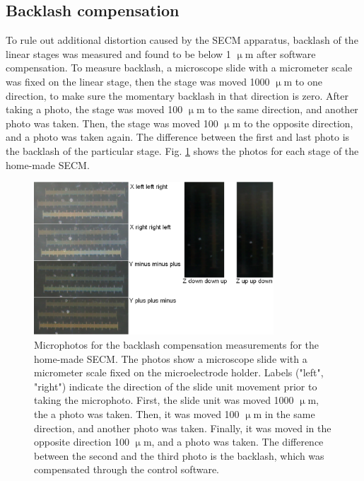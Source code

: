 		\subsection{Backlash compensation}
To rule out additional distortion caused by the SECM apparatus, backlash of the linear stages was measured and found to be below 1 $\upmu$m after software compensation.
To measure backlash, a microscope slide with a micrometer scale was fixed on the linear stage, then the stage was moved 1000 $\upmu$m to one direction, to make sure the momentary backlash in that direction is zero.
After taking a photo, the stage was moved 100 $\upmu$m to the same direction, and another photo was taken.
Then, the stage was moved 100 $\upmu$m to the opposite direction, and a photo was taken again.
The difference between the first and last photo is the backlash of the particular stage.
Fig. \ref{fig:backlash} shows the photos for each stage of the home-made SECM.

\begin{figure}
\centering
\includegraphics[width=0.8\textwidth]{img/backlash.eps}
\caption[Microphotos for the backlash compensation measurements for the home-made SECM.]{Microphotos for the backlash compensation measurements for the home-made SECM.
The photos show a microscope slide with a micrometer scale fixed on the microelectrode holder.
Labels ("left", "right") indicate the direction of the slide unit movement prior to taking the microphoto.
First, the slide unit was moved 1000 $\upmu$m, the a photo was taken.
Then, it was moved 100 $\upmu$m in the same direction, and another photo was taken.
Finally, it was moved in the opposite direction 100 $\upmu$m, and a photo was taken.
The difference between the second and the third photo is the backlash, which was compensated through the control software.}
\label{fig:backlash}
\end{figure}

